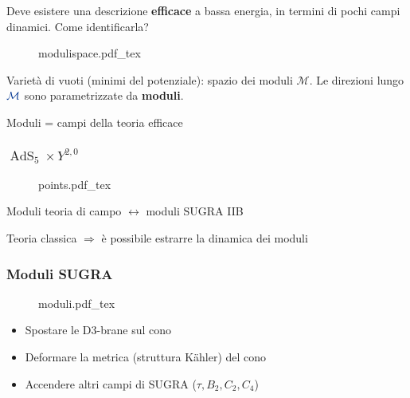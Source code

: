 \documentclass[aspectratio=43,mathserif]{beamer}
\newcommand{\ads}{\ensuremath{\operatorname{AdS}}}
\begin{document}
\begin{frame}

	Deve esistere una descrizione \textbf{efficace} a bassa energia, in termini di pochi campi dinamici. Come identificarla?


	\begin{figure}[h!]\centering
		\def\svgscale{0.45}
		{modulispace.pdf_tex}
	\end{figure}

	Varietà di vuoti (minimi del potenziale): {\color{mblue}spazio dei moduli $\mathcal{M}$}. Le direzioni lungo $\color{mblue}\mathcal{M}$ sono parametrizzate da \textbf{moduli}. 
	\begin{center}	
		Moduli = campi della teoria efficace
	\end{center}


\end{frame}

\begin{frame}
	\frametitle{$ \ads_5 \times Y^{2,0} $}

	\vspace{-20pt}
	\begin{figure}[h!]\centering
		\def\svgscale{0.5}
		{points.pdf_tex}
	\end{figure}


	\vspace{-30pt}
	
	\vfill

	\begin{center}
		Moduli teoria di campo $\leftrightarrow$ moduli SUGRA IIB	
	\end{center}

	\vfill Teoria classica $\Rightarrow$ è possibile estrarre la dinamica dei moduli

\end{frame}

\begin{frame}
	\frametitle{Moduli SUGRA}
	\vspace{-5pt}
	\begin{figure}[h!]\centering
		\def\svgscale{0.3}
		{moduli.pdf_tex}
	\end{figure}
	\vspace{-10pt}
	\begin{itemize}
		\item Spostare le D3-brane sul cono 
		\item Deformare la metrica (struttura K\"ahler) del cono
		\item Accendere altri campi di SUGRA ($\tau,B_2,C_2,C_4$)
	\end{itemize}
\end{frame}
\end{document}
